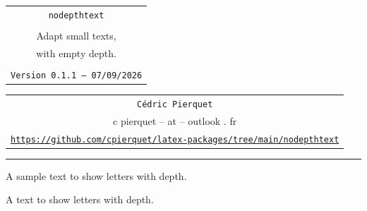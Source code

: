\documentclass[11pt,a4paper]{ltxdoc}
\def\TPversion{0.1.1}
\def\TPdate{07/09/2026}
\begin{document}
\thispagestyle{empty}

\begin{center}
	\begin{minipage}{0.88\linewidth}
		\begin{tcolorbox}[colframe=yellow,colback=yellow!15]
			\begin{center}
				\renewcommand{\arraystretch}{1.25}%
				\begin{tabular}{c}
					{\Huge \texttt{nodepthtext}}\\
					\\
					{\LARGE Adapt small texts,} \\
					{\LARGE with empty depth.} \\
					\\
					{\small \texttt{Version \TPversion{} -- \TPdate}}
				\end{tabular}
			\end{center}
		\end{tcolorbox}
	\end{minipage}
\end{center}

\begin{center}
	\begin{tabular}{c}
		\texttt{Cédric Pierquet}\\
		{\ttfamily c pierquet -- at -- outlook . fr}\\
		\texttt{\url{https://github.com/cpierquet/latex-packages/tree/main/nodepthtext}} \\
	\end{tabular}
\end{center}

\hrule

\vfill

\begin{tcolorbox}[colframe=lightgray,colback=lightgray!5]
A sample text to show letters with depth.\\
\end{tcolorbox}

\begin{tcolorbox}[colframe=lightgray,colback=lightgray!5]
{\LARGE\ttfamily A text to show letters with depth.}\\
{\LARGE\ttfamily{}}\\
{\LARGE\ttfamily{}}
\end{tcolorbox}
\end{document}
